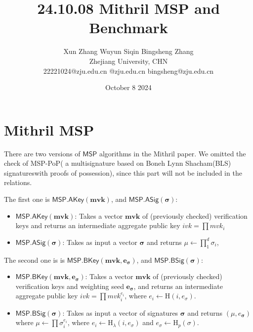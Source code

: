 \documentclass{article}
\title{24.10.08 Mithril MSP and Benchmark}
\author{Xun Zhang \quad \quad Wuyun Siqin \quad \quad Bingsheng Zhang \\ 
Zhejiang University, CHN \\
22221024@zju.edu.cn \quad 3210101763@zju.edu.cn \quad bingsheng@zju.edu.cn}
\date{October 8 2024}
\begin{document}
\maketitle

\section{Mithril MSP}

There are two versions of $\mathsf{MSP}$ algorithms in the Mithril paper.
We omitted the check of MSP-PoP( a multisignature based on Boneh Lynn Shacham(BLS) signatureswith proofs of possession), since this part will not be included in the relations.


The first one is $\mathsf{MSP.AKey}(\textbf{mvk})$, and $\mathsf{MSP.ASig}(\bm{\sigma})$:


\begin{itemize}
    \item $\mathsf{MSP.AKey}(\textbf{mvk})$: Takes a vector $\textbf{mvk}$ of (previously checked) verification keys and returns an intermediate aggregate public key
    $ivk=\prod mvk_i$
    \item  $\mathsf{MSP.ASig}(\bm{\sigma})$: Takes as input a vector $\bm{\sigma}$ and returns $\mu \leftarrow \prod_{1}^d \sigma_i$,
\end{itemize}

The second one is is $\mathsf{MSP.BKey}(\textbf{mvk}, \bm{e_\sigma})$, and $\mathsf{MSP.BSig}(\bm{\sigma})$:


\begin{itemize}
    \item $\mathsf{MSP.BKey}(\textbf{mvk}, \bm{e_\sigma})$: Takes a vector $\textbf{mvk}$ of (previously checked) verification keys and weighting seed $\bm{e_\sigma}$, and returns an intermediate aggregate public key 
$ivk=\prod mvk_i^{e_i} $, where $e_i \leftarrow \textrm{H}(i,e_\sigma)$.
    \item $\mathsf{MSP.BSig}(\bm{\sigma})$: Takes as input a vector of signatures $\bm{\sigma}$ and returns $(\mu,e_{\bm{\sigma}})$ where
$\mu \leftarrow \prod \sigma_i^{e_i}$, where $e_i \leftarrow \textrm{H}_{\lambda}(i,e_\sigma)$ and $e_\sigma \leftarrow \textrm{H}_{p}(\mathbb{\sigma})$.
\end{itemize}
\end{document}
